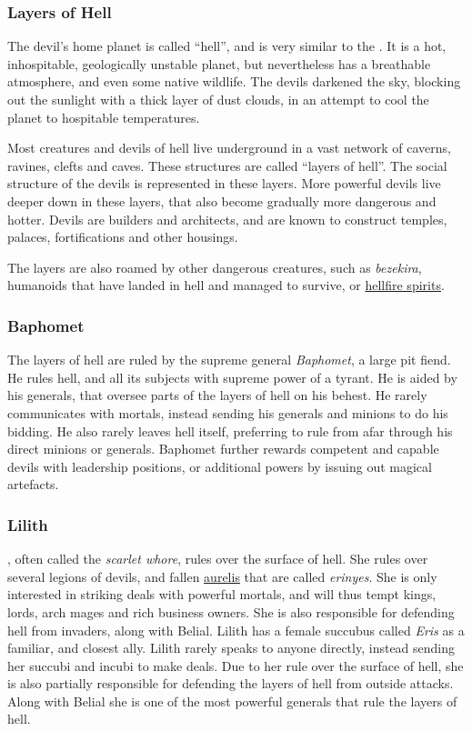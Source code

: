 \subsubsection{Layers of Hell}
\label{sec:Layers of Hell}

The devil's home planet is called ``hell'', and is very similar to the
. It is a hot, inhospitable, geologically unstable planet,
but nevertheless has a breathable atmosphere, and even some native
wildlife. The devils darkened the sky, blocking out the sunlight with a thick
layer of dust clouds, in an attempt to cool the planet to hospitable
temperatures.

Most creatures and devils of hell live underground in a vast network of
caverns, ravines, clefts and caves. These structures are called ``layers of
hell''. The social structure of the devils is represented in these layers.
More powerful devils live deeper down in these layers, that also become
gradually more dangerous and hotter. Devils are builders and architects, and
are known to construct temples, palaces, fortifications and other housings.

The layers are also roamed by other dangerous creatures, such as
\emph{bezekira}, humanoids that have landed in hell and managed to survive,
or \hyperref[sec:monster:Hellfire Spirit]{hellfire spirits}.

\subsubsection{Baphomet}
\label{sec:Baphomet}

The layers of hell are ruled by the supreme general \emph{Baphomet}, a large
pit fiend. He rules hell, and all its subjects with supreme power of a
tyrant. He is aided by his generals, that oversee parts of the layers of
hell on his behest. He rarely communicates with mortals, instead sending his
generals and minions to do his bidding. He also rarely leaves hell itself,
preferring to rule from afar through his direct minions or generals. Baphomet
further rewards competent and capable devils with leadership positions, or
additional powers by issuing out magical artefacts.

\subsubsection{Lilith}

, often called the \emph{scarlet whore}, rules over the
surface of hell. She rules over several legions of devils, and fallen
\hyperref[sec:Aurelis]{aurelis} that are called \emph{erinyes}. She is only
interested in striking deals with powerful mortals, and will thus tempt kings,
lords, arch mages and rich business owners. She is also responsible for
defending hell from invaders, along with Belial. Lilith has a female succubus
called \emph{Eris} as a familiar, and closest ally. Lilith rarely speaks to
anyone directly, instead sending her succubi and incubi to make deals. Due
to her rule over the surface of hell, she is also partially responsible for
defending the layers of hell from outside attacks. Along with Belial she is
one of the most powerful generals that rule the layers of hell.

